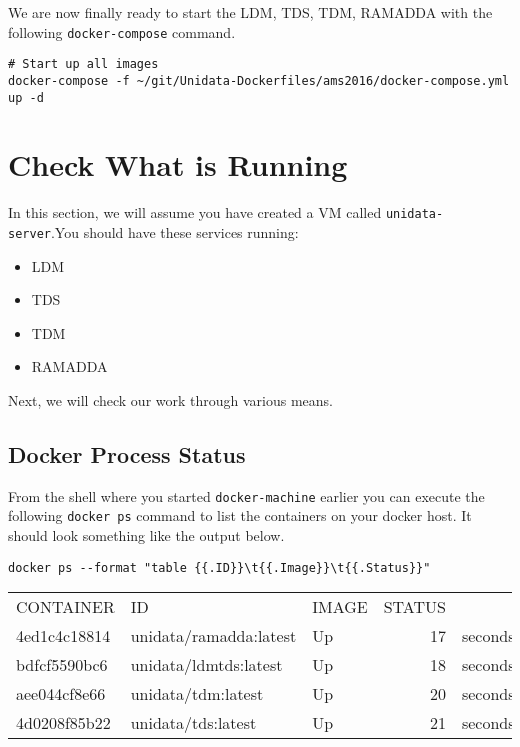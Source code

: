 \documentclass[11pt]{article}
\begin{document}
We are now finally ready to start the LDM, TDS, TDM, RAMADDA with the following \texttt{docker-compose} command.

\begin{verbatim}
# Start up all images
docker-compose -f ~/git/Unidata-Dockerfiles/ams2016/docker-compose.yml up -d
\end{verbatim}

\section{Check What is Running}
\label{sec:orgheadline43}
\label{orgtarget3}
In this section, we will assume you have created a VM called \texttt{unidata-server}.You should have these services running:

\begin{itemize}
\item LDM
\item TDS
\item TDM
\item RAMADDA
\end{itemize}

Next, we will check our work through various means.

\subsection{Docker Process Status}
\label{sec:orgheadline38}

From the shell where you started \texttt{docker-machine} earlier you can execute the following \texttt{docker ps} command to list the containers on your docker host. It should look something like the output below.

\begin{verbatim}
docker ps --format "table {{.ID}}\t{{.Image}}\t{{.Status}}"
\end{verbatim}

\begin{center}
\begin{tabular}{lllrl}
CONTAINER & ID & IMAGE & STATUS & \\
4ed1c4c18814 & unidata/ramadda:latest & Up & 17 & seconds\\
bdfcf5590bc6 & unidata/ldmtds:latest & Up & 18 & seconds\\
aee044cf8e66 & unidata/tdm:latest & Up & 20 & seconds\\
4d0208f85b22 & unidata/tds:latest & Up & 21 & seconds\\
\end{tabular}
\end{center}
\end{document}
